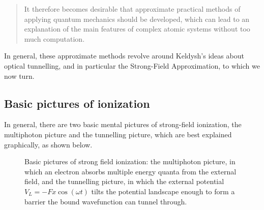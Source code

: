 \begin{quote}
It therefore becomes desirable that approximate practical methods of applying quantum mechanics should be developed, which can lead to an explanation of the main features of complex atomic systems without too much computation.
\end{quote}
%
%
In general, these approximate methods revolve around Keldysh's ideas about optical tunnelling, and in particular the Strong-Field Approximation, to which we now turn.



\subsection{Basic pictures of ionization}
In general, there are two basic mental pictures of strong-field ionization, the multiphoton picture and the tunnelling picture, which are best explained graphically, as shown below.


\begin{figure}[h]
  \centering
  \hspace{3mm}
  \caption[Basic pictures of strong field ionization]{
  Basic pictures of strong field ionization: \protect{} the multiphoton picture, in which an electron absorbs multiple energy quanta from the external field, and \protect{} the tunnelling picture, in which the external potential $V_L = -Fx\cos(\omega t)$ tilts the potential landscape enough to form a barrier the bound wavefunction can tunnel through.
  }
\label{f1-basic-pictures}
\end{figure}

